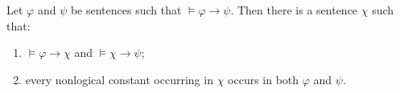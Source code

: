 Let $\varphi$ and $\psi$ be sentences such that $\models \varphi \rightarrow \psi$. Then there is a sentence $\chi$ such that:
\begin{enumerate}
\item[(i)] $\models \varphi \rightarrow \chi$ and $\models \chi \rightarrow \psi$;
\item[(ii)] every nonlogical constant occurring in $\chi$ occurs in both $\varphi$ and $\psi$.
\end{enumerate}
